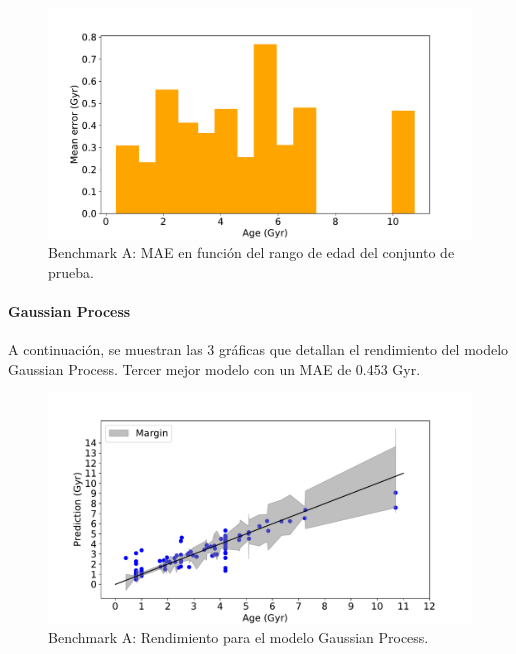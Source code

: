 \begin{figure}[H]
\begin{center}
 \includegraphics[width=0.8\linewidth]{Figuras/Experimentos/B_A_nnet_3.pdf}
\end{center}
\caption{Benchmark A: MAE en función del rango de edad del conjunto de prueba.}
 \label{fig:benchA_details_nnet_3}
\end{figure}

\paragraph{Gaussian Process} 
A continuación, se muestran las 3 gráficas que detallan el rendimiento del modelo Gaussian Process. Tercer mejor modelo con un MAE de 0.453 Gyr.

\begin{figure}[H]
\begin{center}
 \includegraphics[width=0.8\linewidth]{Figuras/Experimentos/B_A_gp_1.pdf}
\end{center}
\caption{Benchmark A: Rendimiento para el modelo Gaussian Process.}
 \label{fig:benchA_details_gp_1}
\end{figure}

